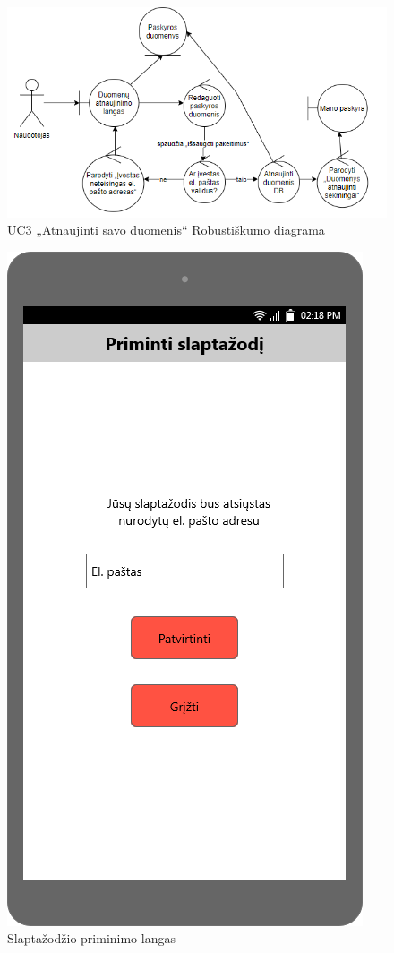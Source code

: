 \documentclass{VUMIFPSbakalaurinis}
\begin{document}
\begin{figure}[H]
	\centering
	\includegraphics[scale=0.6]{img/Robustness/UC3}
	\caption{UC3 „Atnaujinti savo duomenis“ Robustiškumo diagrama}
	\label{img:uc3rob}
\end{figure}

\begin{figure}[H]
	\centering
	\includegraphics[scale=0.4]{img/ScreenShots/03-Slaptažodžio-priminimo-langas}
	\caption{Slaptažodžio priminimo langas}
	\label{img:forget pass}
\end{figure}
\end{document}

